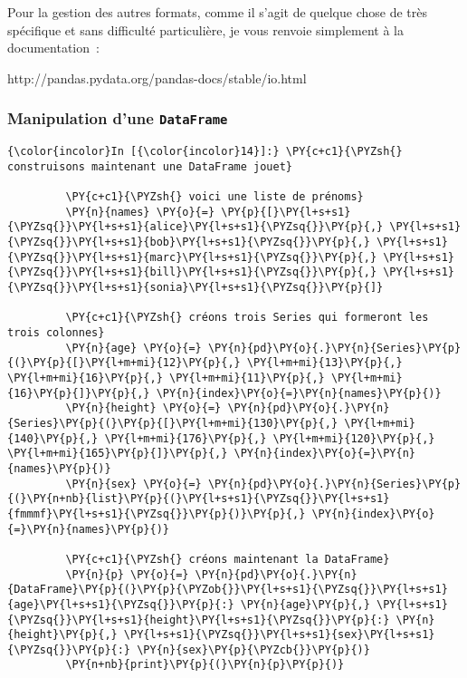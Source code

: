     Pour la gestion des autres formats, comme il s'agit de quelque chose de
très spécifique et sans difficulté particulière, je vous renvoie
simplement à la documentation~:

http://pandas.pydata.org/pandas-docs/stable/io.html

    \hypertarget{manipulation-dune-dataframe}{%
\subsubsection{\texorpdfstring{Manipulation d'une
\texttt{DataFrame}}{Manipulation d'une DataFrame}}\label{manipulation-dune-dataframe}}

    \begin{Verbatim}[commandchars=\\\{\},frame=single,framerule=0.3mm,rulecolor=\color{cellframecolor}]
{\color{incolor}In [{\color{incolor}14}]:} \PY{c+c1}{\PYZsh{} construisons maintenant une DataFrame jouet}
         
         \PY{c+c1}{\PYZsh{} voici une liste de prénoms}
         \PY{n}{names} \PY{o}{=} \PY{p}{[}\PY{l+s+s1}{\PYZsq{}}\PY{l+s+s1}{alice}\PY{l+s+s1}{\PYZsq{}}\PY{p}{,} \PY{l+s+s1}{\PYZsq{}}\PY{l+s+s1}{bob}\PY{l+s+s1}{\PYZsq{}}\PY{p}{,} \PY{l+s+s1}{\PYZsq{}}\PY{l+s+s1}{marc}\PY{l+s+s1}{\PYZsq{}}\PY{p}{,} \PY{l+s+s1}{\PYZsq{}}\PY{l+s+s1}{bill}\PY{l+s+s1}{\PYZsq{}}\PY{p}{,} \PY{l+s+s1}{\PYZsq{}}\PY{l+s+s1}{sonia}\PY{l+s+s1}{\PYZsq{}}\PY{p}{]}
         
         \PY{c+c1}{\PYZsh{} créons trois Series qui formeront les trois colonnes}
         \PY{n}{age} \PY{o}{=} \PY{n}{pd}\PY{o}{.}\PY{n}{Series}\PY{p}{(}\PY{p}{[}\PY{l+m+mi}{12}\PY{p}{,} \PY{l+m+mi}{13}\PY{p}{,} \PY{l+m+mi}{16}\PY{p}{,} \PY{l+m+mi}{11}\PY{p}{,} \PY{l+m+mi}{16}\PY{p}{]}\PY{p}{,} \PY{n}{index}\PY{o}{=}\PY{n}{names}\PY{p}{)}
         \PY{n}{height} \PY{o}{=} \PY{n}{pd}\PY{o}{.}\PY{n}{Series}\PY{p}{(}\PY{p}{[}\PY{l+m+mi}{130}\PY{p}{,} \PY{l+m+mi}{140}\PY{p}{,} \PY{l+m+mi}{176}\PY{p}{,} \PY{l+m+mi}{120}\PY{p}{,} \PY{l+m+mi}{165}\PY{p}{]}\PY{p}{,} \PY{n}{index}\PY{o}{=}\PY{n}{names}\PY{p}{)}
         \PY{n}{sex} \PY{o}{=} \PY{n}{pd}\PY{o}{.}\PY{n}{Series}\PY{p}{(}\PY{n+nb}{list}\PY{p}{(}\PY{l+s+s1}{\PYZsq{}}\PY{l+s+s1}{fmmmf}\PY{l+s+s1}{\PYZsq{}}\PY{p}{)}\PY{p}{,} \PY{n}{index}\PY{o}{=}\PY{n}{names}\PY{p}{)}
         
         \PY{c+c1}{\PYZsh{} créons maintenant la DataFrame}
         \PY{n}{p} \PY{o}{=} \PY{n}{pd}\PY{o}{.}\PY{n}{DataFrame}\PY{p}{(}\PY{p}{\PYZob{}}\PY{l+s+s1}{\PYZsq{}}\PY{l+s+s1}{age}\PY{l+s+s1}{\PYZsq{}}\PY{p}{:} \PY{n}{age}\PY{p}{,} \PY{l+s+s1}{\PYZsq{}}\PY{l+s+s1}{height}\PY{l+s+s1}{\PYZsq{}}\PY{p}{:} \PY{n}{height}\PY{p}{,} \PY{l+s+s1}{\PYZsq{}}\PY{l+s+s1}{sex}\PY{l+s+s1}{\PYZsq{}}\PY{p}{:} \PY{n}{sex}\PY{p}{\PYZcb{}}\PY{p}{)}
         \PY{n+nb}{print}\PY{p}{(}\PY{n}{p}\PY{p}{)}
\end{Verbatim}


